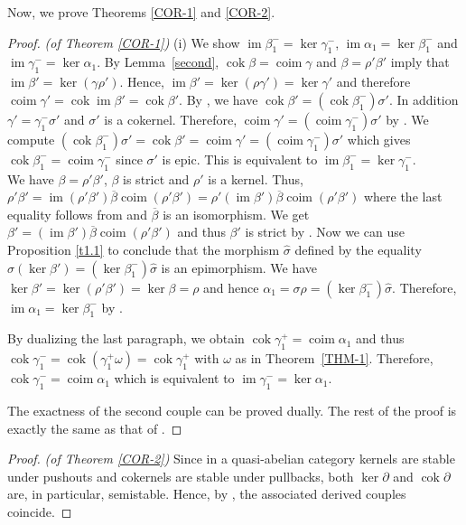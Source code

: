 \documentclass[a4paper,10pt,reqno]{amsart}
\renewcommand{\bar}{\overline}
\newcommand{\cok}{\operatorname{cok}\nolimits}
\newcommand{\coker}{\operatorname{cok}\nolimits}
\newcommand{\im}{\operatorname{im}\nolimits}
\newcommand{\coim}{\operatorname{coim}\nolimits}
\begin{document}
	Now, we prove Theorems \ref{COR-1} and \ref{COR-2}.
	
	\begin{proof}\textit{(of Theorem \ref{COR-1})} (i) We show $\im\beta_1^-=\ker\gamma_1^-$, $\im\alpha_1=\ker\beta_1^-$ and $\im\gamma_1^-=\ker\alpha_1$. By Lemma~\ref{second}, $\cok\beta=\coim\gamma$ and $\beta=\rho'\beta'$ imply that $\im\beta'=\ker(\gamma\rho')$. Hence, $\im\beta'=\ker(\rho\gamma')=\ker\gamma'$ and therefore $\coim\gamma'=\cok\im\beta'=\cok\beta'$. By \cite[Lemma 2.1(iii)]{KW}, we have $\cok\beta'=(\cok\beta_1^-)\sigma'$. In addition $\gamma'=\gamma_1^-\sigma'$ and $\sigma'$ is a cokernel. Therefore, $\coim\gamma'=(\coim\gamma_1^-)\sigma'$ by \cite[Cor.~2.3(ii) and Proposition~3.2]{KW}. We compute $(\cok\beta_1^-)\sigma'=\cok\beta'=\coim\gamma'= (\coim\gamma_1^-)\sigma'$ which gives $\cok\beta_1^-=\coim\gamma_1^-$ since $\sigma'$ is epic. This is equivalent to $\im\beta_1^-=\ker\gamma_1^-$.
		\smallskip
		\\We have $\beta=\rho'\beta'$, $\beta$ is strict and $\rho'$ is a kernel. Thus, $\rho'\beta'=\im(\rho'\beta')\bar{\beta}\coim(\rho'\beta')=\rho'(\im\beta')\bar{\beta}\coim(\rho'\beta')$ where the last equality follows from \cite[Corollary~2.3(i) and Proposition~3.1]{KW} and $\bar{\beta}$ is an isomorphism. We get $\beta'=(\im\beta')\bar{\beta}\coim(\rho'\beta')$ and thus $\beta'$ is strict by \cite[Remark~1.1.2(c)]{Schneiders1999}. Now we can use Proposition \ref{t1.1} to conclude that the morphism $\widehat\sigma$ defined by the equality $\sigma(\ker\beta')=(\ker\beta_1^-)\widehat\sigma$ is an epimorphism. We have $\ker\beta'=\ker(\rho'\beta')=\ker\beta=\rho$ and hence $\alpha_1=\sigma\rho=(\ker\beta_1^-)\widehat\sigma$. Therefore, $\im\alpha_1=\ker\beta_1^-$ by \cite[Corollary~2.3(i) and Proposition~3.1]{KW}.
		
		\smallskip
		
		By dualizing the last paragraph, we obtain $\cok\gamma_1^+=\coim\alpha_1$ and thus $\cok\gamma_1^-=\cok(\gamma_1^+\omega)=\cok\gamma_1^+$ with $\omega$ as in Theorem~\ref{THM-1}. Therefore, $\cok\gamma_1^-=\coim\alpha_1$ which is equivalent to $\im\gamma_1^-=\ker\alpha_1$.
		
		\smallskip
		
		The exactness of the second couple can be proved dually. The rest of the proof is exactly the same as that of \cite[Theorem 1.]{KW2}.
	\end{proof}
	
	\begin{proof}\textit{(of Theorem \ref{COR-2})}
		Since in a quasi-abelian category kernels are stable under pushouts and cokernels are stable under pullbacks, both $\ker \partial$ and $\coker \partial$ are, in particular, semistable. Hence, by \cite[Theorem~1(iii)]{KW2}, the associated derived couples coincide.
	\end{proof}
	
\end{document}
